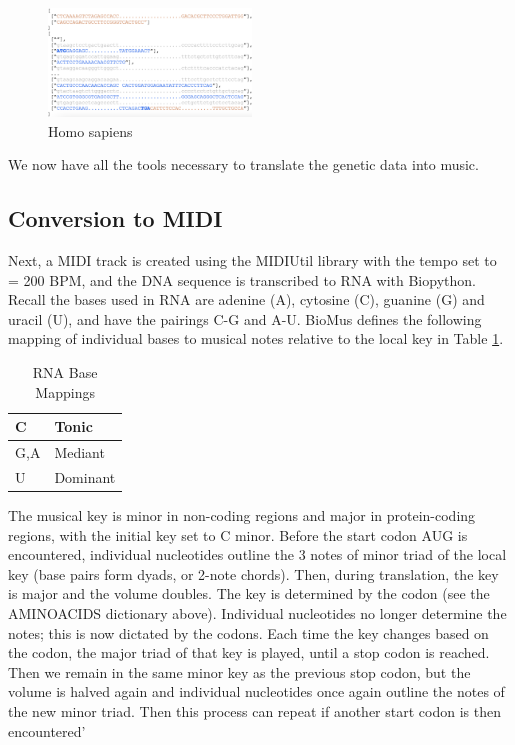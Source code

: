 \documentclass[letterpaper]{article}
\begin{document}
\begin{figure}[h!]
\centering
\includegraphics[width=0.48\textwidth]{images/post_processed_seq_homo_sapiens_tp53_ABBREV}
\vspace{-3mm}
  \caption{Homo sapiens}\label{fig:post_processed_seq_homo_sapiens_tp53}
  \vspace{-3mm}
\end{figure}

We now have all the tools necessary to translate the genetic data into music.

\subsection{Conversion to MIDI}

Next, a MIDI track is created using the MIDIUtil library with the tempo set to \musQuarter\;= 200 BPM, and the DNA sequence is transcribed to RNA with Biopython. Recall the bases used in RNA are adenine (A), cytosine (C), guanine (G) and uracil (U), and have the pairings C-G and A-U. BioMus defines the following mapping of individual bases to musical notes relative to the local key in Table  \ref{table:nucleotides}.

\begin{table}[h!]
\centering
\begin{tabular}{|l|l|}
\hline
C   & Tonic    \\ \hline
G,A & Mediant  \\ \hline
U   & Dominant \\ \hline
\end{tabular}
\caption{RNA Base Mappings}
\label{table:nucleotides}
\end{table}

The musical key is minor in non-coding regions and major in protein-coding regions, with the initial key set to C minor. Before the start codon AUG is encountered, individual nucleotides outline the 3 notes of minor triad of the local key (base pairs form dyads, or 2-note chords). Then, during translation, the key is major and the volume doubles. The
        key is determined by the codon (see the AMINOACIDS dictionary above). Individual nucleotides no longer determine the notes; this is now dictated
        by the codons. Each time the key changes based on the codon, the major triad of that key is played, until a stop codon is reached. Then we remain in
        the same minor key as the previous stop codon, but the volume is halved again and individual nucleotides once again outline the notes of the new
        minor triad. Then this process can repeat if another start codon is then encountered'
\end{document}
